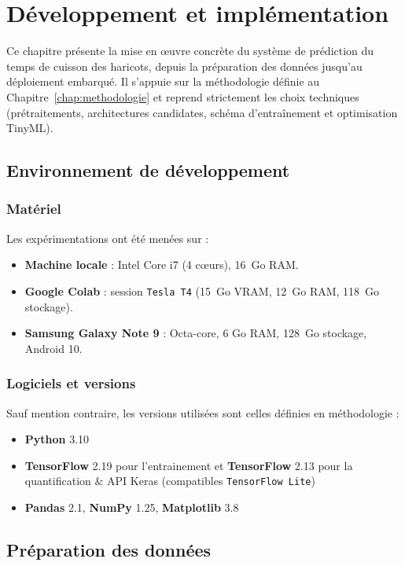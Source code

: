\chapter{Développement et implémentation}
\label{chap:developpement}

Ce chapitre présente la mise en œuvre concrète du système de prédiction du temps de cuisson des haricots, depuis la préparation des données jusqu’au déploiement embarqué. Il s’appuie sur la méthodologie définie au Chapitre~\ref{chap:methodologie} et reprend strictement les choix techniques (prétraitements, architectures candidates, schéma d’entraînement et optimisation TinyML).

\section{Environnement de développement}
\label{sec:env_dev}

\subsection{Matériel}
Les expérimentations ont été menées sur :
\begin{itemize}
	\item \textbf{Machine locale} : Intel Core i7 (4 cœurs), 16~Go RAM.
	\item \textbf{Google Colab} : session \texttt{Tesla T4} (15~Go VRAM, 12~Go RAM, 118~Go stockage).
	\item \textbf{Samsung Galaxy Note 9} : Octa-core, 6 Go RAM, 128~Go stockage, Android 10.
\end{itemize}

\subsection{Logiciels et versions}
Sauf mention contraire, les versions utilisées sont celles définies en méthodologie :
\begin{itemize}
	\item \textbf{Python} 3.10
	\item \textbf{TensorFlow} 2.19 pour l'entrainement et \textbf{TensorFlow} 2.13 pour la quantification \& API Keras (compatibles \texttt{TensorFlow Lite})
	\item \textbf{Pandas} 2.1, \textbf{NumPy} 1.25, \textbf{Matplotlib} 3.8
\end{itemize}

\section{Préparation des données}
\label{sec:pretraitement}

